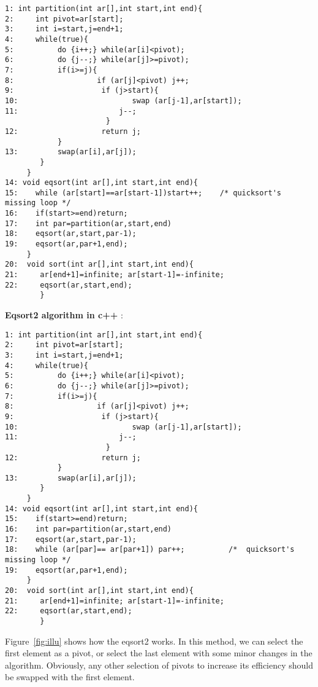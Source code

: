 \documentclass{article}
\begin{document}
\begin{lstlisting}
1: int partition(int ar[],int start,int end){
2:     int pivot=ar[start];
3:     int i=start,j=end+1;
4:     while(true){
5:          do {i++;} while(ar[i]<pivot);
6:          do {j--;} while(ar[j]>=pivot);
7:          if(i>=j){
8:                   if (ar[j]<pivot) j++;
9:                    if (j>start){
10:                          swap (ar[j-1],ar[start]);
11:                       j--;
                       }
12:                   return j;
            }
13:         swap(ar[i],ar[j]);
        }
     }
14: void eqsort(int ar[],int start,int end){
15:    while (ar[start]==ar[start-1])start++;    /* quicksort's missing loop */
16:    if(start>=end)return;
17:    int par=partition(ar,start,end)
18:    eqsort(ar,start,par-1);
19:    eqsort(ar,par+1,end);
     }
20:  void sort(int ar[],int start,int end){
21:     ar[end+1]=infinite; ar[start-1]=-infinite;
22:     eqsort(ar,start,end);
        }
\end{lstlisting}

\textbf{Eqsort2 algorithm in c++ }:

\begin{lstlisting}
1: int partition(int ar[],int start,int end){
2:     int pivot=ar[start];
3:     int i=start,j=end+1;
4:     while(true){
5:          do {i++;} while(ar[i]<pivot);
6:          do {j--;} while(ar[j]>=pivot);
7:          if(i>=j){
8:                   if (ar[j]<pivot) j++;
9:                    if (j>start){
10:                          swap (ar[j-1],ar[start]);
11:                       j--;
                       }
12:                   return j;
            }
13:         swap(ar[i],ar[j]);
        }
     }
14: void eqsort(int ar[],int start,int end){
15:    if(start>=end)return;
16:    int par=partition(ar,start,end)
17:    eqsort(ar,start,par-1);
18:    while (ar[par]== ar[par+1]) par++;          /*  quicksort's missing loop */
19:    eqsort(ar,par+1,end);
     }
20:  void sort(int ar[],int start,int end){
21:     ar[end+1]=infinite; ar[start-1]=-infinite;
22:     eqsort(ar,start,end);
        }
\end{lstlisting}
 Figure~\ref{fig:illu} shows how the eqsort2 works. In this method, we can select the first element as a pivot, or select the last element with some minor changes in the algorithm. Obviously, any other selection of pivots to increase its efficiency should be swapped with the first element.
\end{document}
